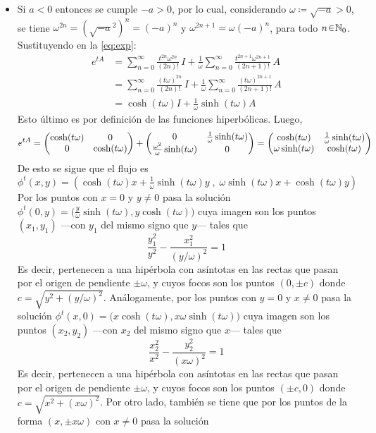 \begin{sol}
\begin{itemize}
    \item Si $a < 0$ entonces se cumple $-a >0$, por lo cual, considerando $\omega \coloneq \sqrt{-a} >0$, se tiene $\omega^{2n} = (\sqrt{-a}^2)^n = (-a)^n$ y $\omega^{2n+1} = \omega(-a)^n$, para todo $n \en \mathbb{N}_0$. Sustituyendo en la \cref{eq:exp}:
    \begin{align*}
    e^{tA}%
    &= \sum^\infty_{n=0} \frac{t^{2n}\omega^{2n}}{(2n)!}\, I + \frac{1}{\omega}\sum^\infty_{n=0} \frac{t^{2n+1}\omega^{2n+1}}{(2n+1)!}\, A\\
    &= \sum^\infty_{n=0} \frac{(t\omega)^{2n}}{(2n)!}\, I + \frac{1}{\omega}\sum^\infty_{n=0} \frac{(t\omega)^{2n+1}}{(2n+1)!}\, A\\
    &= \cosh(t\omega)I + \frac{1}{\omega}\sinh(t\omega)A
    \end{align*}
    Esto último es por definición de las funciones hiperbólicas. Luego,
    \[
    e^{tA} = \mqty( \cosh(t\omega) & 0 \\ 0 & \cosh(t\omega)) + \mqty(0 & \frac{1}{\omega} \sinh(t\omega) \\ \frac{\omega^2}{\omega} 
    \sinh(t\omega) & 0) = \mqty( \cosh(t\omega) & \frac{1}{\omega} \sinh(t\omega) \\ \omega 
    \sinh(t\omega) & \cosh(t\omega))
    \]
    De esto se sigue que el flujo es
    \[
    \phi^t(x,y) = \left(%
        \cosh(t\omega) x + \tfrac{1}{\omega}\sinh(t\omega) y\;,\;%
        \omega\sinh(t\omega) x + \cosh(t\omega) y
    \right)
    \]
    Por los puntos con $x=0$  y $y \neq 0$ pasa la solución $\phi^t(0,y) = \big(\frac{y}{\omega}\sinh(t\omega),y\cosh(t\omega)\big)$ cuya imagen son los puntos $(x_1,y_1)$ ---con $y_1$ del mismo signo que $y$--- tales que
    \[
    \frac{y_1^2}{y^2} - \frac{x_1^2}{({y}/{\omega})^2} = 1
    \]
    Es decir, pertenecen a una hipérbola con asíntotas en las rectas que pasan por el origen de pendiente $\pm \omega$, y cuyos focos son los puntos $(0, \pm c)$ donde $c = \sqrt{y^2 + (y/\omega)^2}$. Análogamente, por los puntos con $y=0$ y $x \neq 0$ pasa la solución $\phi^t(x,0) = \big(x\cosh(t\omega), x\omega\sinh(t\omega)\big)$ cuya imagen son los puntos $(x_2,y_2)$ ---con $x_2$ del mismo signo que $x$--- tales que 
    \[
    \frac{x_2^2}{x^2} - \frac{y_2^2}{(x\omega)^2} = 1
    \]
    Es decir, pertenecen a una hipérbola con asíntotas en las rectas que pasan por el origen de pendiente $\pm\omega$, y cuyos focos son los puntos $(\pm c,0)$ donde $c = \sqrt{x^2 + (x\omega)^2}$. Por otro lado, también se tiene que por los puntos de la forma $(x,\pm x\omega)$ con $x \neq 0$ pasa la solución

\end{itemize}
\end{sol}
